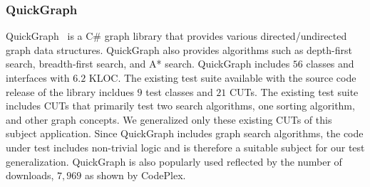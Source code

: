 \subsubsection{QuickGraph}

QuickGraph~\cite{quickgraph} is a C\# graph library that provides various directed/undirected graph data structures. QuickGraph also provides algorithms such as depth-first search, breadth-first search, and A* search. QuickGraph includes $56$ classes and interfaces with $6.2$ KLOC. The existing test suite available with the source code release of the library incldues $9$ test classes and $21$ CUTs. The existing test suite includes CUTs that primarily test two search algorithms, one sorting algorithm, and other graph concepts. We generalized only these existing CUTs of this subject application. Since QuickGraph includes graph search algorithms, the code under test includes non-trivial logic and is therefore a suitable subject for our test generalization. QuickGraph is also popularly used reflected by the number of downloads, $7,969$ as shown by CodePlex.



